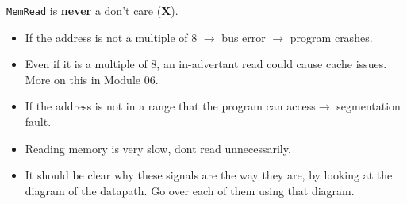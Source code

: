 \begin{frame}[fragile]
\begin{center}
        \smallskip
      	\end{center}  
       \begin{tcolorbox}[enhanced,attach boxed title to top center={yshift=-3mm,yshifttext=-1mm},
  colback=green!5!white,colframe=green!75!black,colbacktitle=green!80!black,
  title=Remember It,fonttitle=\bfseries,
  boxed title style={size=small,colframe=green!50!black} ]
{\footnotesize 
{\tt MemRead} is \textbf{never} a don’t care (\textbf{X}).
\begin{itemize}
\item  If the address is not a multiple of 8 $\rightarrow$ bus error $\rightarrow$ program crashes.
\item Even if it is a multiple of 8, an in-advertant read could cause cache issues. {\tiny{More on this in Module 06.}}
\item If the address is not in a range that the program can access$\rightarrow$ segmentation fault.
\item Reading memory is very slow, dont read unnecessarily.
\end{itemize}
}
  \end{tcolorbox}


\BNotes\ifnum{}
\begin{itemize}
\item It should be clear why these signals are the way they are, by
looking at the diagram of the datapath. Go over each of them using
that diagram.


\end{itemize}
\end{frame}
